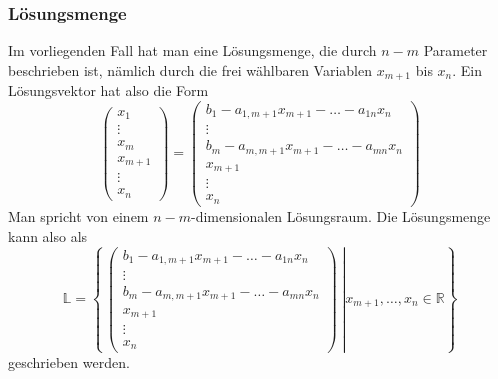 \subsubsection{Lösungsmenge}
Im vorliegenden Fall hat man eine Lösungsmenge, die durch $n-m$
Parameter beschrieben ist, nämlich durch die frei wählbaren
Variablen $x_{m+1}$ bis $x_n$.
Ein Lösungsvektor hat also die
Form 
\[
\begin{pmatrix}
x_1\\\vdots\\x_m\\x_{m+1}\\\vdots\\x_n
\end{pmatrix}
=
\begin{pmatrix}
b_1-a_{1,m+1}x_{m+1}-\dots-a_{1n}x_n\\
\vdots\\
b_m-a_{m,m+1}x_{m+1}-\dots-a_{mn}x_n\\
x_{m+1}\\
\vdots\\
x_n
\end{pmatrix}
\]
Man spricht von einem $n-m$-dimensionalen Lösungsraum.
Die Lösungsmenge kann also als
\[
\mathbb L
=
\left\{
\,
\left.
\begin{pmatrix}
b_1-a_{1,m+1}x_{m+1}-\dots-a_{1n}x_n\\
\vdots\\
b_m-a_{m,m+1}x_{m+1}-\dots-a_{mn}x_n\\
x_{m+1}\\
\vdots\\
x_n
\end{pmatrix}
\;
\right|
x_{m+1},\dots,x_n\in\mathbb R
\right\}
\]
geschrieben werden.
